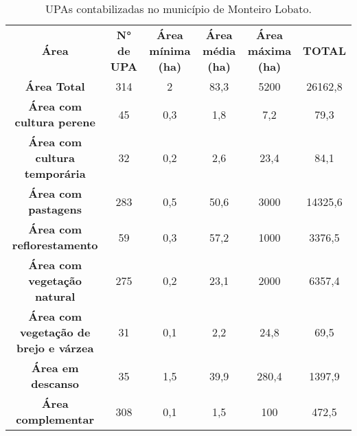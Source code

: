 \begin{table}[htbp]
  \centering
  \caption{UPAs contabilizadas no município de Monteiro Lobato.}
    \begin{tabular}{c|c|c|c|c|c}
    \rowcolor[rgb]{ .969,  .588,  .275} \textcolor[rgb]{ 1,  1,  1}{\textbf{Área}} & \multicolumn{1}{p{4.215em}|}{\textcolor[rgb]{ 1,  1,  1}{\textbf{N° de UPA}}} & \multicolumn{1}{p{4.215em}|}{\textcolor[rgb]{ 1,  1,  1}{\textbf{Área mínima (ha)}}} & \multicolumn{1}{p{4.215em}|}{\textcolor[rgb]{ 1,  1,  1}{\textbf{Área média (ha)}}} & \multicolumn{1}{p{4.215em}|}{\textcolor[rgb]{ 1,  1,  1}{\textbf{Área máxima (ha)}}} & \multicolumn{1}{p{4.215em}}{\textcolor[rgb]{ 1,  1,  1}{\textbf{TOTAL}}} \\
    \rowcolor[rgb]{ .992,  .914,  .851} \textbf{Área Total} & 314   & 2     & 83,3  & 5200  & 26162,8 \\
    \rowcolor[rgb]{ .984,  .831,  .706} \textbf{Área com cultura perene} & 45    & 0,3   & 1,8   & 7,2   & 79,3 \\
    \rowcolor[rgb]{ .992,  .914,  .851} \textbf{Área com cultura temporária} & 32    & 0,2   & 2,6   & 23,4  & 84,1 \\
    \rowcolor[rgb]{ .984,  .831,  .706} \textbf{Área com pastagens} & 283   & 0,5   & 50,6  & 3000  & 14325,6 \\
    \rowcolor[rgb]{ .992,  .914,  .851} \textbf{Área com reflorestamento} & 59    & 0,3   & 57,2  & 1000  & 3376,5 \\
    \rowcolor[rgb]{ .984,  .831,  .706} \textbf{Área com vegetação natural} & 275   & 0,2   & 23,1  & 2000  & 6357,4 \\
    \rowcolor[rgb]{ .992,  .914,  .851} \textbf{Área com vegetação de brejo e várzea} & 31    & 0,1   & 2,2   & 24,8  & 69,5 \\
    \rowcolor[rgb]{ .984,  .831,  .706} \textbf{Área em descanso} & 35    & 1,5   & 39,9  & 280,4 & 1397,9 \\
    \rowcolor[rgb]{ .992,  .914,  .851} \textbf{Área complementar} & 308   & 0,1   & 1,5   & 100   & 472,5 \\
    \end{tabular}%
  \label{tab:upas}%
\end{table}%
